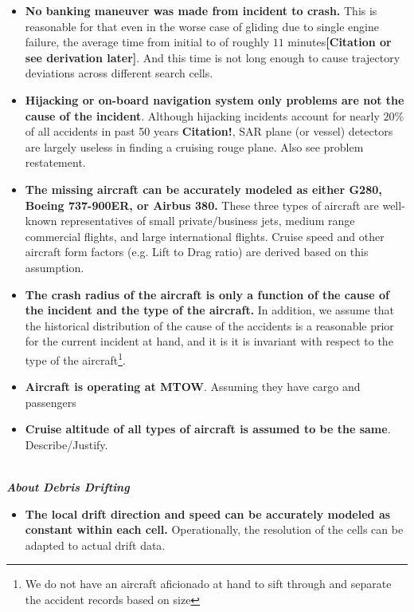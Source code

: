 \documentclass[12pt, letterpaper]{article}  %
\theoremstyle{definition}
\theoremstyle{remark}
\theoremstyle{plain}
\begin{document}
\begin{itemize}
\item \textbf{No banking maneuver was made from incident to crash.} This is reasonable for that even in the worse case of gliding due to single engine failure, the average time from initial to of roughly $11$ minutes\textbf{[Citation or see derivation later]}. And this time is not long enough to cause trajectory deviations across different search cells.
\item \textbf{Hijacking or on-board navigation system only problems are not the cause of the incident}. Although hijacking incidents account for nearly $20$\% of all accidents in past 50 years \textbf{Citation!}, SAR plane (or vessel) detectors are largely useless in finding a cruising rouge plane. Also see problem restatement.
\item \textbf{The missing aircraft can be accurately modeled as either G280, Boeing 737-900ER, or Airbus 380.} These three types of aircraft are well-known representatives of small private/business jets, medium range commercial flights, and large international flights. Cruise speed and other aircraft form factors (e.g. Lift to Drag ratio) are derived based on this assumption.
\item \textbf{The crash radius of the aircraft is only a function of the cause of the incident and the type of the aircraft.} In addition, we assume that the historical distribution of the cause of the accidents is a reasonable prior for the current incident at hand, and it is it is invariant with respect to the type of the aircraft\footnote{We do not have an aircraft aficionado at hand to sift through and separate the accident records based on size}.
\item \textbf{Aircraft is operating at MTOW}. Assuming they have cargo and passengers 
\item \textbf{Cruise altitude of all types of aircraft is assumed to be the same}.  Describe/Justify.
\end{itemize}

\ \\
\textit{\textbf{About Debris Drifting}}
\begin{itemize}
\item \textbf{The local drift direction and speed can be accurately modeled as constant within each cell.} Operationally, the resolution of the cells can be adapted to actual drift data.
\end{itemize}
\end{document}
